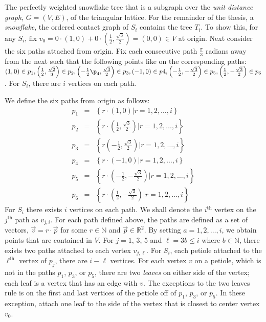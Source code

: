 \documentclass[10pt]{CSUNthesis}
\theoremstyle{plain}%
\theoremstyle{definition}
\theoremstyle{remark}
\newcommand{\ith}{i^\text{th}}
\newcommand{\jth}{j^\text{th}}
\newcommand{\bbR}{{\mathbb{R}}}
\newcommand{\bbN}{{\mathbb{N}}}
\newcommand{\set}[2]{{\left\lbrace \left.  #1 \left\vert #2  \right.\right.\right\rbrace  }}
\newcommand{\lr}[1]{\left( #1 \right)}
\begin{document}
The perfectly weighted snowflake tree that is a subgraph over the \textit{unit distance graph}, $G=(V,E)$, of the triangular lattice.  
For the remainder of the thesis, a \textit{snowflake}, the ordered contact graph of $S_i$ contains the tree $T_i$.  
To show this, for any $S_i$, fix $v_0 = 0 \cdot (1,0) + 0 \cdot \left(\frac{1}{2},\frac{\sqrt{3}}{2}\right)=\lr{0,0} \in V$ at origin.  
Next consider the six paths attached from origin.  
Fix each consecutive path $\frac{\pi}{3}$ radians away from the next such that the following points like on the corresponding paths: $\lr{1,0} \in p_1, \lr{\frac{1}{2} ,\frac{\sqrt{2}}{3}} \in p_2,\lr{-\frac{1}{2}\p_4,\frac{\sqrt{3}}{2}} \in p_3, \lr{-1,0} \in p4, \lr{-\frac{1}{2},-\frac{\sqrt{3}}{2}}\in p_5,\lr{\frac{1}{2},-\frac{\sqrt{3}}{2}}\in p_6$.  
For $S_i$, there are $i$ vertices on each path.  

We define the six paths from origin as follows:      
\begin{eqnarray*}
p_1 &=& \set{r\cdot\lr{1,0}}{r = 1,2,\dots, i}\\
p_2 &=& \set{r\cdot\lr{\frac{1}{2},\frac{\sqrt{3}}{2}}}{r = 1,2,\dots, i}\\
p_3 &=& \set{r\lr{-\frac{1}{2},\frac{\sqrt{3}}{2}}}{r = 1,2,\dots, i}\\
p_4 &=& \set{r \cdot \lr{-1,0}}{r = 1,2,\dots, i}\\
p_5 &=& \set{r \cdot \lr{-\frac{1}{2},-\frac{\sqrt{3}}{2}}}{r = 1,2,\dots, i}\\
p_6 &=& \set{r \cdot \lr{\frac{1}{2}, -\frac{\sqrt{3}}{2}}}{r = 1,2,\dots, i}
\end{eqnarray*}
For $S_i$ there exists $i$ vertices on each path.  We shall denote the $\ith$ vertex on the $\jth$ path as $v_{j,i}$.  
For each path defined above, the paths are defined as a set of vectors, $\vec{v} = r \cdot \vec{p}$  for some $r \in \bbN$ and $\vec{p} \in \bbR^2$.  
By setting $a = 1,2,\dots, i$, we obtain points that are contained in $V$.  
For $j = 1$, $3$, $5$ and $\ell = 3 b \leq i$ where $b \in \bbN$,  there exists two paths attached to each vertex $v_{j,\ell}$.  
For $S_i$, each petiole attached to the $\ell^\text{th}$ vertex of $p_j$, there are $i-\ell$ vertices. 
For each vertex $v$ on a petiole, which is not in the paths $p_1$, $p_3$, or $p_5$, there are two \textit{leaves} on either side of the vertex; each leaf is a vertex that has an edge with $v$.  
The exceptions to the two leaves rule is on the first and last vertices of the petiole off of $p_1$, $p_3$, or $p_5$.  
In these exception, attach one leaf to the side of the vertex that is closest to center vertex $v_0$.
\end{document}
